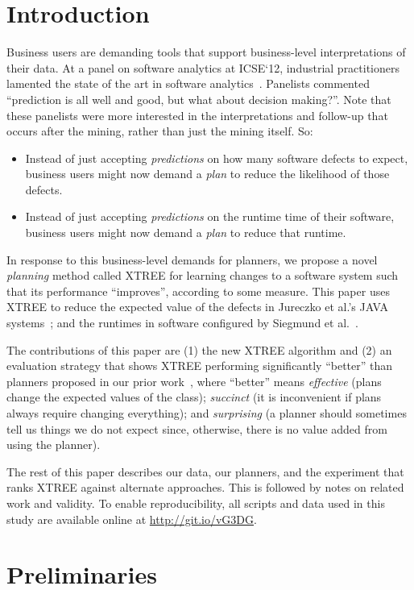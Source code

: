 \documentclass{sig-alternate}
\newcommand{\bi}{\begin{itemize}}
\newcommand{\ei}{\end{itemize}}
\begin{document}
\section{Introduction}
Business users are demanding  tools that support    business-level interpretations of their data. At a panel on software analytics at ICSE`12, industrial practitioners lamented the state of the art in software analytics~\cite{menzies12a}. Panelists commented  ``prediction is all well and good, but what about decision making?''. Note that these panelists were more interested in the interpretations and follow-up that occurs after the mining, rather than just the mining itself. So:
\bi
\item
Instead of just accepting {\em predictions} on how many software defects to expect, business users might now demand a {\em plan} to reduce the likelihood of those defects.
\item
Instead of just accepting {\em predictions} on the runtime time of their software, business users might now demand a {\em plan} to reduce that runtime. 
\ei
In response to this business-level demands for planners,
we propose a novel {\em planning} method called XTREE for learning changes to a software system
such that its performance ``improves'', according to some measure. This paper uses XTREE
to reduce  the expected value of the
defects     in Jureczko et al.'s    JAVA systems~\cite{jureczko10};
and the runtimes   in   software    configured by  Siegmund et al.~\cite{sven12}.

The contributions of this paper are (1)  
    the new XTREE    algorithm and (2) an evaluation strategy that shows
 XTREE performing significantly ``better'' than    planners  proposed in our prior   work~\cite{me12c,krishna15},
 where ``better'' means 
{\em effective} (plans change the  expected values of the class);
{\em succinct} (it is inconvenient if  plans   always require changing  everything);
and {\em surprising} (a planner should sometimes tell us things we do not expect
since, otherwise,
there is no value added from  using the planner).

The rest of this paper   describes our data, our planners, and the experiment that
ranks XTREE against alternate approaches.  This is followed by notes on related work
and validity.
To enable reproducibility, all scripts and data used in this 
study are available online at \url{http://git.io/vG3DG}.

\section{Preliminaries}\label{sect:prelim}
\end{document}
